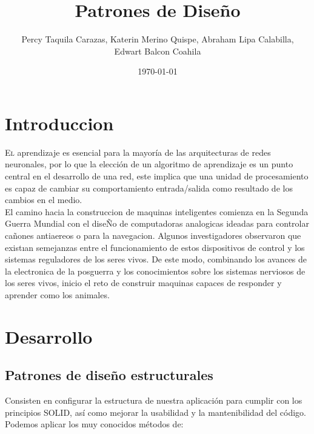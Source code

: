 \documentclass[twoside,twocolumn]{article}
\title{Patrones de Diseño}
\author{Percy Taquila Carazas, Katerin Merino Quispe, Abraham Lipa Calabilla,
\\Edwart Balcon Coahila}
\date{\today}
\begin{document}
\maketitle


\section{Introduccion}

\lettrine[nindent=0em,lines=3]{E}l aprendizaje es esencial para la mayoría de las arquitecturas de redes neuronales, por lo que la elección de un algoritmo de aprendizaje es un punto central en el desarrollo de una red, este implica que una unidad de procesamiento es capaz de cambiar su comportamiento entrada/salida
como resultado de los cambios en el medio.\\

El camino hacia la construccion de maquinas inteligentes comienza en la Segunda Guerra Mundial con el diseÑo de computadoras analogicas ideadas para controlar cañones antiaereos o para la navegacion.
Algunos investigadores observaron que existıan semejanzas entre el funcionamiento de estos dispositivos de control y los sistemas reguladores de los seres vivos. De este modo, combinando los avances de la electronica de la posguerra y los conocimientos sobre los sistemas nerviosos de los seres vivos, inicio el reto de construir maquinas capaces de responder y aprender como los animales.






\section{Desarrollo}


\subsection{Patrones de diseño estructurales}

Consisten en configurar la estructura de nuestra aplicación para cumplir con los principios SOLID, así como mejorar la usabilidad y la mantenibilidad del código. Podemos aplicar los muy conocidos métodos de:
\end{document}
